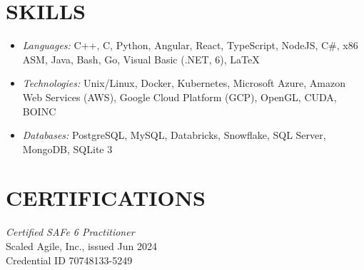\documentclass[margin]{res} %
\begin{document}
\begin{resume}


\pagebreak



\section{SKILLS}

\begin{itemize}[leftmargin=0cm, label={}]
    \item {\sl Languages:\/} 
    C++, C, Python, Angular, React, TypeScript, NodeJS, C\#, x86 ASM, Java, Bash, Go, Visual Basic (.NET, 6), {\LaTeX} 
    \item {\sl Technologies:\/} 
    Unix/Linux, Docker, Kubernetes, Microsoft Azure, Amazon Web Services (AWS), Google Cloud Platform (GCP), OpenGL, CUDA, BOINC
    \item {\sl Databases:\/}
    PostgreSQL, MySQL, Databricks, Snowflake, SQL Server, MongoDB, SQLite 3
\end{itemize}

\section{CERTIFICATIONS}

{\sl Certified SAFe\textsuperscript{\tiny\textregistered} 6 Practitioner\/}\\
Scaled Agile, Inc., issued Jun 2024\\
Credential ID 70748133-5249





\end{resume}
\end{document}
